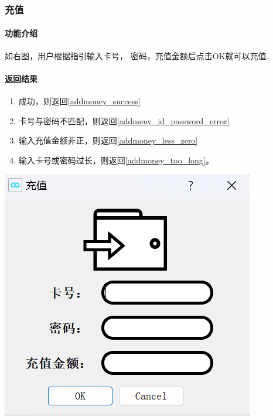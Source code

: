 \documentclass{article}
\begin{document}
    \subsubsection{充值}
    \begin{minipage}[h]{0.5\linewidth}
        \paragraph{功能介绍}
        如右图，用户根据指引输入卡号，
        密码，充值金额后点击OK就可以充值.
        \vfill
        \paragraph{返回结果}
        \begin{enumerate}
            \item 成功，则返回\ref{addmoney_success}
            \item 卡号与密码不匹配，则返回\ref{addmeny_id_password_error}
            \item 输入充值金额非正，则返回\ref{addmoney_less_zero}
            \item 输入卡号或密码过长，则返回\ref{addmoney_too_long}。
        \end{enumerate}
    \end{minipage}
    \begin{minipage}[h]{0.5\linewidth}
        \centering
        \includegraphics[scale=0.6]{figure/addmoney.png}
        \label{addmoney}
    \end{minipage}
\end{document}

